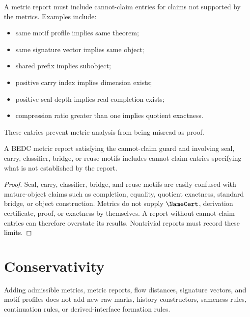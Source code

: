 \begin{definition}
\label{def:metrics-cannot-claim-entries}
A metric report must include cannot-claim entries for claims not supported by the metrics. Examples include:
\begin{itemize}
\item same motif profile implies same theorem;
\item same signature vector implies same object;
\item shared prefix implies subobject;
\item positive carry index implies dimension exists;
\item positive seal depth implies real completion exists;
\item compression ratio greater than one implies quotient exactness.
\end{itemize}
These entries prevent metric analysis from being misread as proof.
\end{definition}

\begin{proposition}
\label{prop:metrics-cannot-claims-required}
A BEDC metric report satisfying the cannot-claim guard and involving seal, carry, classifier, bridge, or reuse motifs includes cannot-claim entries specifying what is not established by the report.
\end{proposition}

\begin{proof}
Seal, carry, classifier, bridge, and reuse motifs are easily confused with mature-object claims such as completion, equality, quotient exactness, standard bridge, or object construction. Metrics do not supply $\NameCert$, derivation certificate, proof, or exactness by themselves. A report without cannot-claim entries can therefore overstate its results. Nontrivial reports must record these limits.
\end{proof}

\section{Conservativity}
\label{sec:metrics-conservativity}

\begin{theorem}
\label{thm:metrics-conservativity}
Adding admissible metrics, metric reports, flow distances, signature vectors, and motif profiles does not add new raw marks, history constructors, sameness rules, continuation rules, or derived-interface formation rules.
\end{theorem}

